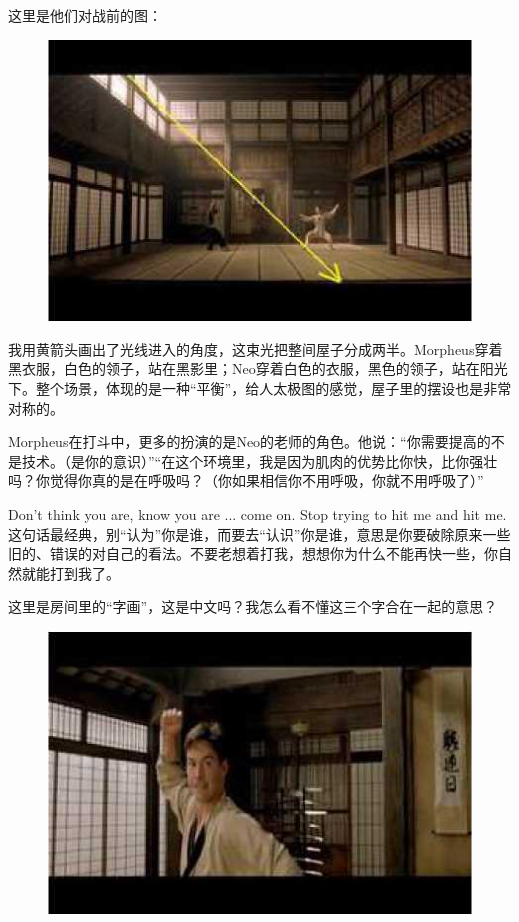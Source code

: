 \documentclass{ctexart}
\begin{document}
这里是他们对战前的图：

\begin{figure}[htb]
\centering
\includegraphics[width=0.5\linewidth]{fig/read_Matrix-31}
\end{figure}

我用黄箭头画出了光线进入的角度，这束光把整间屋子分成两半。Morpheus穿着黑衣服，白色的领子，站在黑影里；Neo穿着白色的衣服，黑色的领子，站在阳光下。整个场景，体现的是一种“平衡”，给人太极图的感觉，屋子里的摆设也是非常对称的。

Morpheus在打斗中，更多的扮演的是Neo的老师的角色。他说：“你需要提高的不是技术。（是你的意识）”“在这个环境里，我是因为肌肉的优势比你快，比你强壮吗？你觉得你真的是在呼吸吗？（你如果相信你不用呼吸，你就不用呼吸了）”

Don't think you are, know you are ... come on. Stop trying to hit me and hit me. 这句话最经典，别“认为”你是谁，而要去“认识”你是谁，意思是你要破除原来一些旧的、错误的对自己的看法。不要老想着打我，想想你为什么不能再快一些，你自然就能打到我了。

这里是房间里的“字画”，这是中文吗？我怎么看不懂这三个字合在一起的意思？

\begin{figure}[htb]
\centering
\includegraphics[width=0.5\linewidth]{fig/read_Matrix-32}
\end{figure}
\end{document}

